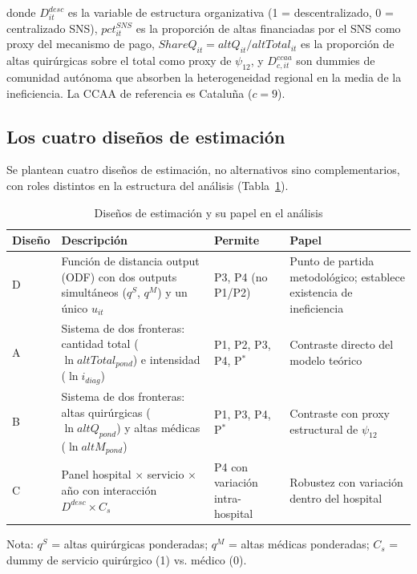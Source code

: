 \documentclass[12pt, a4paper]{article}
\begin{document}
donde $D^{desc}_{it}$ es la variable de estructura
organizativa (1 = descentralizado, 0 = centralizado SNS),
$pct^{SNS}_{it}$ es la proporción de altas financiadas
por el SNS como proxy del mecanismo de pago,
$ShareQ_{it} = altQ_{it}/altTotal_{it}$ es la proporción
de altas quirúrgicas sobre el total como proxy de
$\psi_{12}$, y $D^{ccaa}_{c,it}$ son dummies de comunidad
autónoma que absorben la heterogeneidad regional en la
media de la ineficiencia. La CCAA de referencia es
Cataluña ($c = 9$).

\subsection{Los cuatro diseños de estimación}

Se plantean cuatro diseños de estimación, no
alternativos sino complementarios, con roles distintos
en la estructura del análisis (Tabla~\ref{tab:disenos}).

\begin{table}[h!]
\centering
\caption{Diseños de estimación y su papel en el análisis}
\label{tab:disenos}
\begin{threeparttable}
\small
\begin{tabular}{p{1.2cm}p{3.5cm}p{2.5cm}p{3.5cm}}
\toprule
\textbf{Diseño} & \textbf{Descripción} &
\textbf{Permite} & \textbf{Papel} \\
\midrule
D & Función de distancia output (ODF) con dos outputs
  simultáneos ($q^S$, $q^M$) y un único $u_{it}$
  & P3, P4 (no P1/P2)
  & Punto de partida metodológico; establece
    existencia de ineficiencia \\[6pt]
A & Sistema de dos fronteras: cantidad total
  ($\ln altTotal_{pond}$) e intensidad ($\ln i_{diag}$)
  & P1, P2, P3, P4, P$^*$
  & Contraste directo del modelo teórico \\[6pt]
B & Sistema de dos fronteras: altas quirúrgicas
  ($\ln altQ_{pond}$) y altas médicas ($\ln altM_{pond}$)
  & P1, P3, P4, P$^*$
  & Contraste con proxy estructural de $\psi_{12}$ \\[6pt]
C & Panel hospital $\times$ servicio $\times$ año con
  interacción $D^{desc} \times C_s$
  & P4 con variación intra-hospital
  & Robustez con variación dentro del hospital \\
\bottomrule
\end{tabular}
\begin{tablenotes}
  \small
  \item Nota: $q^S$ = altas quirúrgicas ponderadas;
    $q^M$ = altas médicas ponderadas; $C_s$ = dummy de
    servicio quirúrgico (1) vs. médico (0).
\end{tablenotes}
\end{threeparttable}
\end{table}
\end{document}
